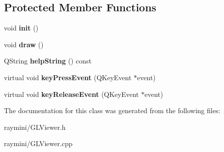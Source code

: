 \subsection*{Protected Member Functions}
\begin{DoxyCompactItemize}
\item 
\hypertarget{class_g_l_viewer_afcc998ee4646a261742b6a70d5827cb1}{
void {\bfseries init} ()}
\label{class_g_l_viewer_afcc998ee4646a261742b6a70d5827cb1}

\item 
\hypertarget{class_g_l_viewer_ae24326f0acdd4c6ff8b3b97ec863be85}{
void {\bfseries draw} ()}
\label{class_g_l_viewer_ae24326f0acdd4c6ff8b3b97ec863be85}

\item 
\hypertarget{class_g_l_viewer_a4d4be1953913ec2025cf856c12c9f506}{
QString {\bfseries helpString} () const }
\label{class_g_l_viewer_a4d4be1953913ec2025cf856c12c9f506}

\item 
\hypertarget{class_g_l_viewer_adb67ff4742ee4aca60688c3cf0f05b13}{
virtual void {\bfseries keyPressEvent} (QKeyEvent $\ast$event)}
\label{class_g_l_viewer_adb67ff4742ee4aca60688c3cf0f05b13}

\item 
\hypertarget{class_g_l_viewer_a654e84b5ce36c34da9f93859afb964b9}{
virtual void {\bfseries keyReleaseEvent} (QKeyEvent $\ast$event)}
\label{class_g_l_viewer_a654e84b5ce36c34da9f93859afb964b9}

\end{DoxyCompactItemize}


The documentation for this class was generated from the following files:\begin{DoxyCompactItemize}
\item 
raymini/GLViewer.h\item 
raymini/GLViewer.cpp\end{DoxyCompactItemize}

